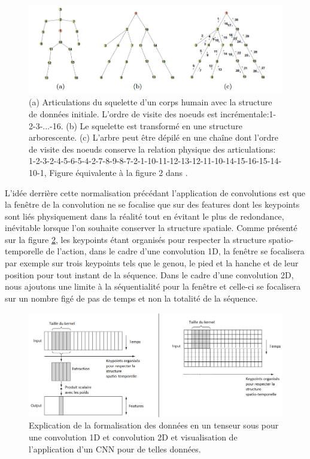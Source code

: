 \begin{figure}[H]
    \centering
    \includegraphics[width=1\linewidth]{Images/DFS.png}
    \caption{(a) Articulations du squelette d'un corps humain avec la structure de données initiale. L'ordre de visite des noeuds est incrémentale:1-2-3-...-16. (b) Le squelette est transformé en une structure arborescente. (c)  L'arbre peut être dépilé en une chaîne dont l'ordre de visite des noeuds conserve la relation physique des articulations: 1-2-3-2-4-5-6-5-4-2-7-8-9-8-7-2-1-10-11-12-13-12-11-10-14-15-16-15-14-10-1, Figure équivalente à la figure 2 dans  \cite{liu2016spatio}.}
    \label{fig:DFS}
\end{figure}


L'idée derrière cette normalisation précédant l'application de convolutions est que la fenêtre de la convolution ne se focalise que  sur des features dont les keypoints sont liés physiquement dans la réalité tout en évitant le plus de redondance, inévitable lorsque l'on souhaite conserver la structure spatiale. Comme présenté sur la figure \ref{fig:explanationCNN}, les keypoints étant organisés pour respecter la structure spatio-temporelle de l'action, dans le cadre d'une convolution 1D, la fenêtre se focalisera par exemple sur trois keypoints tels que le genou, le pied et la hanche et de leur position pour tout instant de la séquence. Dans le cadre d'une convolution 2D, nous ajoutons une limite à la séquentialité pour la fenêtre et celle-ci se focalisera sur un nombre figé de pas de temps et non la totalité de la séquence.



\begin{figure}[H]
    \centering
    \includegraphics[width=0.95\linewidth]{Images/explanation_cnn_dfs.png}
    \caption{Explication de la formalisation des données en un tenseur sous pour une convolution 1D et convolution 2D et visualisation de l'application d'un CNN pour de telles données.}
    \label{fig:explanationCNN}
\end{figure}

